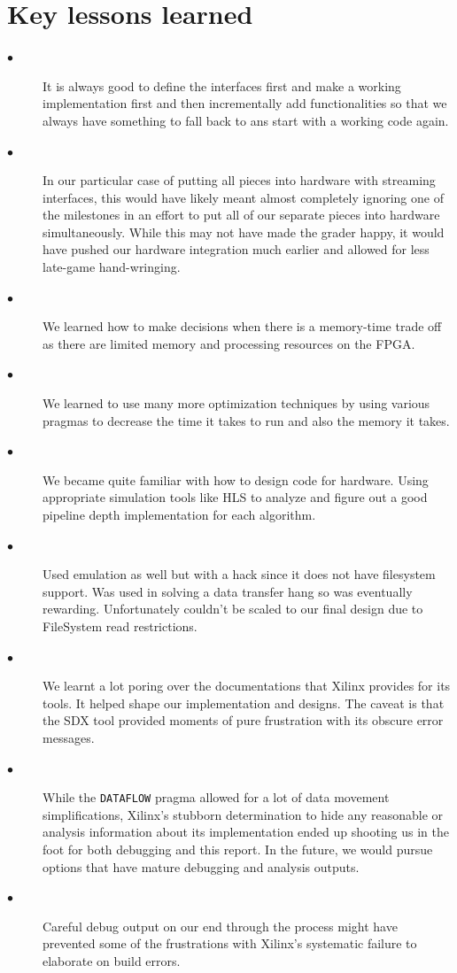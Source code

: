 \documentclass{article}
\begin{document}
\section{Key lessons learned}
\begin{description}
  \item[$\bullet$ ] It is always good to define the interfaces first and make a working implementation first and then incrementally add functionalities so that we always have something to fall back to ans start with a working code again.
  \item[$\bullet$ ] In our particular case of putting all pieces into hardware with streaming interfaces, this would have likely meant almost completely ignoring one of the milestones in an effort to put all of our separate pieces into hardware simultaneously. While this may not have made the grader happy, it would have pushed our hardware integration much earlier and allowed for less late-game hand-wringing.
  \item[$\bullet$ ] We learned how to make decisions when there is a memory-time trade off as there are limited memory and processing resources on the FPGA. 
  \item[$\bullet$ ] We learned to use many more optimization techniques by using various pragmas to decrease the time it takes to run and also the memory it takes. 
  \item[$\bullet$ ] We became quite familiar with how to design code for hardware. Using appropriate simulation tools like HLS to analyze and figure out a good pipeline depth implementation for each algorithm.
  \item[$\bullet$ ] Used emulation as well but with a hack since it does not have filesystem support. Was used in solving a data transfer hang so was eventually rewarding. Unfortunately couldn't be scaled to our final design due to FileSystem read restrictions.
  \item[$\bullet$ ] We learnt a lot poring over the documentations that Xilinx provides for its tools. It helped shape our implementation and designs. The caveat is that the SDX tool provided moments of pure frustration with its obscure error messages.
  \item[$\bullet$ ] While the \texttt{DATAFLOW} pragma allowed for a lot of data movement simplifications, Xilinx's stubborn determination to hide any reasonable or analysis information about its implementation ended up shooting us in the foot for both debugging and this report. In the future, we would pursue options that have mature debugging and analysis outputs.
  \item[$\bullet$ ] Careful debug output on our end through the process might have prevented some of the frustrations with Xilinx's systematic failure to elaborate on build errors.


\end{description}
\end{document}
